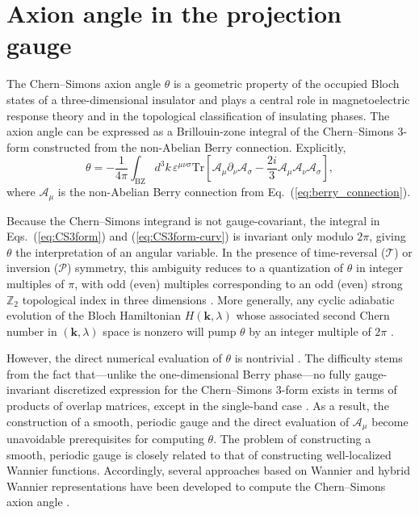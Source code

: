 \documentclass[galley,aps,pra,10pt,amsmath,amssymb,
    superscriptaddress,nofootinbib,longbibliography]{revtex4-2}
\newcounter{comm}
\newcommand{\eq}[1]{Eq.~(\ref{eq:#1})}
\newcommand{\eqs}[2]{Eqs.~(\ref{eq:#1}) and (\ref{eq:#2})}
\begin{document}
\section{Axion angle in the projection gauge}
\label{sec:FKM}

The Chern--Simons axion angle $\theta$ is a geometric property of the occupied Bloch states of a three-dimensional insulator and plays a central role in magnetoelectric response theory and in the topological classification of insulating phases. The axion angle can be expressed as a Brillouin-zone integral of the Chern--Simons 3-form constructed from the non-Abelian Berry connection. Explicitly, \cite{chern1974characteristic, Malashevich_2010, mong2010antiferromagnetic, essin2010orbital}
\begin{equation}
\label{eq:CS3form}
 \theta = -\frac{1}{4\pi} \int_{\text{BZ}} d^3k \,
\varepsilon^{\mu\nu\sigma} \mathrm{Tr} \left[
    \mathcal{A}_\mu \partial_\nu \mathcal{A}_\sigma
    - \frac{2i}{3} \mathcal{A}_\mu \mathcal{A}_\nu \mathcal{A}_\sigma
\right],
\end{equation}
where $\mathcal{A}_\mu$ is the non-Abelian Berry connection from \eq{berry_connection}. 

Because the Chern--Simons integrand is not gauge-covariant, the integral in \eqs{CS3form}{CS3form-curv} is invariant only modulo $2\pi$, giving $\theta$ the interpretation of an angular variable. In the presence of time-reversal ($\mathcal{T}$) or inversion ($\mathcal{P}$) symmetry, this ambiguity reduces to a quantization of $\theta$ in integer multiples of $\pi$, with odd (even) multiples corresponding to an odd (even) strong $\mathbb{Z}_2$ topological index in three dimensions \cite{essin2010orbital, qi2008topological, coh2011chern}. More generally, any cyclic adiabatic evolution of the Bloch Hamiltonian $H(\mathbf{k},\lambda)$ whose associated second Chern number in $(\mathbf{k},\lambda)$ space is nonzero will pump $\theta$ by an integer multiple of $2\pi$ \cite{essin2010orbital, taherinejad2015adiabatic}.

However, the direct numerical evaluation of $\theta$ is nontrivial \cite{coh2011chern, Liu2015, olsen2017surface, varnava2020axion}. The difficulty stems from the fact that---unlike the one-dimensional Berry phase---no fully gauge-invariant discretized expression for the Chern--Simons 3-form exists in terms of products of overlap matrices, except in the single-band case \cite{coh2011chern}. As a result, the construction of a smooth, periodic gauge and the direct evaluation of $\mathcal A_\mu$ become unavoidable prerequisites for computing $\theta$. The problem of constructing a smooth, periodic gauge is closely related to that of constructing well-localized Wannier functions. Accordingly, several approaches based on Wannier and hybrid Wannier representations have been developed to compute the Chern--Simons axion angle \cite{coh2011chern, olsen2017surface, varnava2020axion}. 
\end{document}
